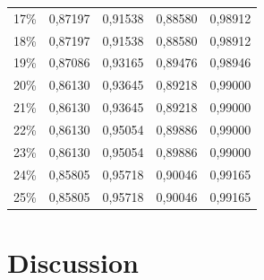 \begin{table}[!ht]
\begin{tabular}{ccccc}
17\%               & 0,87197         & 0,91538        & 0,88580         & 0,98912   \\
18\%               & 0,87197         & 0,91538        & 0,88580         & 0,98912   \\
19\%               & 0,87086         & 0,93165        & 0,89476         & 0,98946   \\
20\%               & 0,86130         & 0,93645        & 0,89218         & 0,99000   \\
21\%               & 0,86130         & 0,93645        & 0,89218         & 0,99000   \\
22\%               & 0,86130         & 0,95054        & 0,89886         & 0,99000   \\
23\%               & 0,86130         & 0,95054        & 0,89886         & 0,99000   \\
24\%               & 0,85805         & 0,95718        & 0,90046         & 0,99165   \\
25\%               & 0,85805         & 0,95718        & 0,90046         & 0,99165  
\end{tabular}
\end{table}

\section{Discussion}
\label{sec:recommendation_discussion}